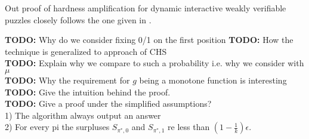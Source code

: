 Out proof of hardness amplification for dynamic interactive weakly verifiable puzzles closely follows the one given in \cite{DBLP:journals/corr/abs-1002-3534}.
\begin{todo}
  \textbf{TODO:} Why do we consider fixing 0/1 on the first position
  \textbf{TODO:} How the technique is generalized to approach of CHS \\
  \textbf{TODO:} Explain why we compare to such a probability i.e. why we consider with $\mu$ \\
  \textbf{TODO:} Why the requirement for $g$ being a monotone function is interesting \\
  \textbf{TODO:} Give the intuition behind the proof. \\
  \textbf{TODO:} Give a proof under the simplified assumptions? \\
  1) The algorithm always output an answer \\
  2) For every pi the surpluses $S_{\pi^*, 0}$ and $S_{\pi^*, 1}$ re less than $(1-\frac{1}{k})\epsilon$.\\
\end{todo}


